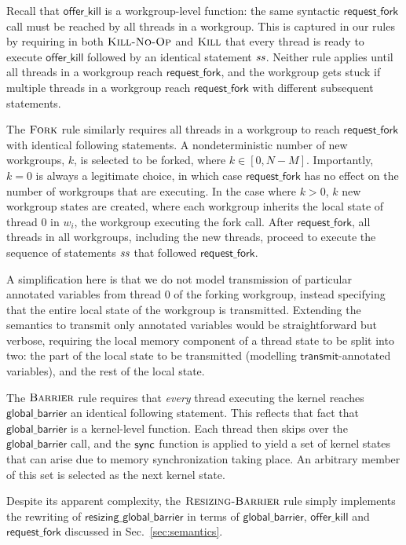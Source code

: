 \documentclass[sigconf]{acmart}
\newcommand{\mysec}{Sec.~}
\newcommand{\transmit}{\mathsf{transmit}}
\newcommand{\offerfork}{\mathsf{request\_fork}}
\newcommand{\offerkill}{\mathsf{offer\_kill}}
\newcommand{\globalbarrier}{\mathsf{global\_barrier}}
\newcommand{\resizingglobalbarrier}{\mathsf{resizing\_global\_barrier}}
\begin{document}
{Recall that $\offerkill$ is a workgroup-level function: the same
syntactic $\offerfork$ call must be reached by all threads in a
workgroup.  This is captured in our rules by requiring in both
$\textsc{Kill-No-Op}$ and $\textsc{Kill}$ that every thread is ready
to execute $\offerkill$ followed by an identical statement $\mathit{ss}$.
Neither rule applies until all threads in a workgroup reach
$\offerfork$, and the workgroup gets stuck if multiple threads in a
workgroup reach $\offerfork$ with different subsequent statements.

The $\textsc{Fork}$ rule similarly requires all threads in a workgroup
to reach $\offerfork$ with identical following statements.  A
nondeterministic number of new workgroups, $k$, is selected to be
forked, where $k \in [0, N-M]$.  Importantly, $k=0$ is always a
legitimate choice, in which case $\offerfork$ has no effect on the
number of workgroups that are executing.  In the case where $k > 0$,
$k$ new workgroup states are created, where each workgroup inherits
the local state of thread 0 in $w_i$, the workgroup executing the fork
call.  After $\offerfork$, all threads in all workgroups, including
the new threads, proceed to execute the sequence of statements $\mathit{ss}$
that followed $\offerfork$.

A simplification here is that we do not model transmission of
particular annotated variables from thread 0 of the forking workgroup,
instead specifying that the entire local state of the workgroup is
transmitted.  Extending the semantics to transmit only annotated
variables would be straightforward but verbose, requiring the local
memory component of a thread state to be split into two: the part of
the local state to be transmitted (modelling $\transmit$-annotated
variables), and the rest of the local state.

The $\textsc{Barrier}$ rule requires that \emph{every} thread
executing the kernel reaches $\globalbarrier$ an identical following
statement.  This reflects that fact that $\globalbarrier$ is a
kernel-level function.  Each thread then skips over the
$\globalbarrier$ call, and the $\mathsf{sync}$ function is applied to yield
a set of kernel states that can arise due to memory synchronization
taking place.  An arbitrary member of this set is selected as the next
kernel state.

Despite its apparent complexity, the $\textsc{Resizing-Barrier}$ rule simply implements the rewriting of $\resizingglobalbarrier$ in terms of $\globalbarrier$, $\offerkill$ and $\offerfork$ discussed in \mysec\ref{sec:semantics}.


}
\end{document}
